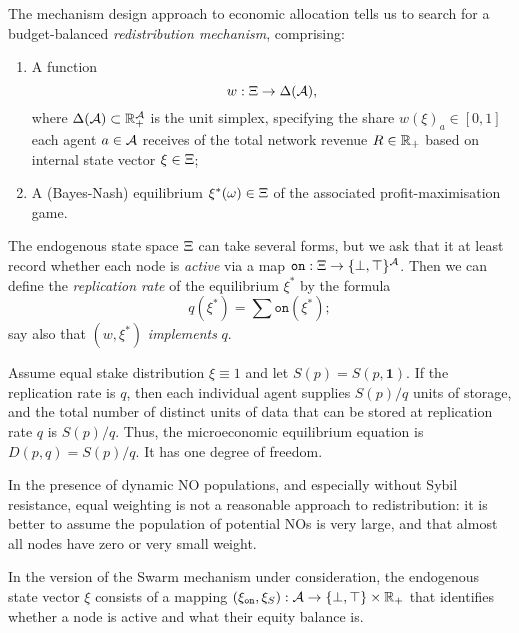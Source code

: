 The mechanism design approach to economic allocation tells us to search for a budget-balanced \emph{redistribution mechanism}, comprising:
\begin{enumerate}
  \item
    A function
    \[
      w:\Xi\rightarrow \Delta(\mathcal{A}),
    \]
    where $\Delta(\mathcal{A})\subset\mathbb{R}_+^{\mathcal{A}}$ is the unit simplex, specifying the share $w(\xi)_a\in [0,1]$ each agent $a\in\mathcal{A}$ receives of the total network revenue $R\in\mathbb{R}_+$ based on internal state vector $\xi\in\Xi$;
    
  \item
    A (Bayes-Nash) equilibrium $\xi^*(\omega)\in\Xi$ of the associated profit-maximisation game.
\end{enumerate}

The endogenous state space $\Xi$ can take several forms, but we ask that it at least record whether each node is \emph{active} via a map $\mathtt{on}:\Xi\rightarrow \{\bot,\top\}^{\mathcal{A}}$.
%
Then we can define the \emph{replication rate} of the equilibrium $\xi^*$ by the formula
\[
  q(\xi^*) = \sum\mathtt{on}(\xi^*);
\]
say also that $(w,\xi^*)$ \emph{implements} $q$.


\begin{example}

  Assume equal stake distribution $\xi \equiv 1$ and let $S(p)=S(p,\mathbf{1})$.
  If the replication rate is $q$, then each individual agent supplies $S(p)/q$ units of storage, and the total number of distinct units of data that can be stored at replication rate $q$ is $S(p)/q$.
  Thus, the microeconomic equilibrium equation is $D(p,q)=S(p)/q$.
  It has one degree of freedom.

  In the presence of dynamic NO populations, and especially without Sybil resistance, equal weighting is not a reasonable approach to redistribution: it is better to assume the population of potential NOs is very large, and that almost all nodes have zero or very small weight.

\end{example}

\begin{example}
  
  In the version of the Swarm mechanism under consideration, the endogenous state vector $\xi$ consists of a mapping $(\xi_\mathtt{on},\xi_S):\mathcal{A}\rightarrow \{\bot,\top\}\times\mathbb{R}_+$ that identifies whether a node is active and what their equity balance is.

\end{example}


